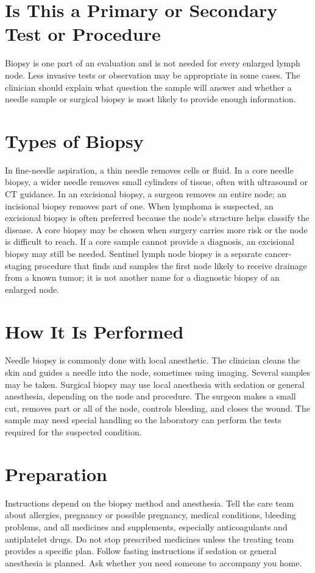 \section*{Is This a Primary or Secondary Test or Procedure}
Biopsy is one part of an evaluation and is not needed for every enlarged lymph node. Less invasive tests or observation may be appropriate in some cases. The clinician should explain what question the sample will answer and whether a needle sample or surgical biopsy is most likely to provide enough information.

\section*{Types of Biopsy}
In fine-needle aspiration, a thin needle removes cells or fluid. In a core needle biopsy, a wider needle removes small cylinders of tissue, often with ultrasound or CT guidance. In an excisional biopsy, a surgeon removes an entire node; an incisional biopsy removes part of one. When lymphoma is suspected, an excisional biopsy is often preferred because the node's structure helps classify the disease. A core biopsy may be chosen when surgery carries more risk or the node is difficult to reach. If a core sample cannot provide a diagnosis, an excisional biopsy may still be needed. Sentinel lymph node biopsy is a separate cancer-staging procedure that finds and samples the first node likely to receive drainage from a known tumor; it is not another name for a diagnostic biopsy of an enlarged node.

\section*{How It Is Performed}
Needle biopsy is commonly done with local anesthetic. The clinician cleans the skin and guides a needle into the node, sometimes using imaging. Several samples may be taken. Surgical biopsy may use local anesthesia with sedation or general anesthesia, depending on the node and procedure. The surgeon makes a small cut, removes part or all of the node, controls bleeding, and closes the wound. The sample may need special handling so the laboratory can perform the tests required for the suspected condition.

\section*{Preparation}
Instructions depend on the biopsy method and anesthesia. Tell the care team about allergies, pregnancy or possible pregnancy, medical conditions, bleeding problems, and all medicines and supplements, especially anticoagulants and antiplatelet drugs. Do not stop prescribed medicines unless the treating team provides a specific plan. Follow fasting instructions if sedation or general anesthesia is planned. Ask whether you need someone to accompany you home.

